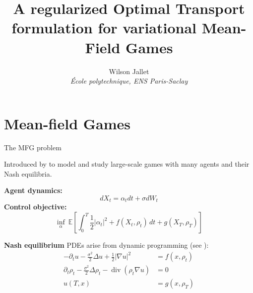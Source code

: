 \documentclass[xcolor={dvipsnames}]{beamer}
\author{
	Wilson Jallet\\
	\textit{École polytechnique, ENS Paris-Saclay}
}
\title{A regularized Optimal Transport formulation for variational Mean-Field Games}
\newcommand{\EE}{\mathbb{E}}
\DeclareMathOperator{\divg}{div}
\begin{document}
\maketitle

\section{Mean-field Games}

\begin{frame}[allowframebreaks]{The MFG problem}
	
	Introduced by \textcite{LASRY2006619,LASRY2006679} to model and study large-scale games with many agents and their Nash equilibria.
	
	\textbf{Agent dynamics:}
	\begin{equation}
		dX_t = \alpha_t dt + \sigma dW_t
	\end{equation}
	\textbf{Control objective:}
	\begin{equation}
		\inf_\alpha~
		\EE\left[
		\int_0^T \frac{1}{2}|\alpha_t|^2 + f(X_t, \rho_t) \, dt + g(X_T, \rho_T)
		\right]
	\end{equation}
	
	\framebreak
	
	\textbf{Nash equilibrium} PDEs arise from dynamic programming (see \textcite{LASRY2006679}):
	\begin{subequations}
	\begin{align}
		-\partial_t u - \frac{\sigma^2}{2}\Delta u + \frac{1}{2}|\nabla u|^2 &= f(x, \rho_t) \\
		\partial_t \rho_t - \frac{\sigma^2}{2}\Delta \rho_t - \divg(\rho_t \nabla u) &= 0 \\
		u(T, x) &= g(x, \rho_T)
	\end{align}
	\end{subequations}
\end{frame}
\end{document}
